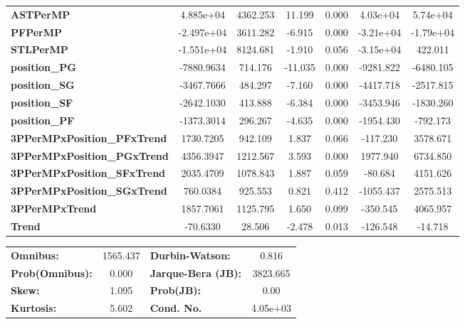 \begin{center}
\begin{tabular}{lcccccc}
\textbf{ASTPerMP}                   &    4.885e+04  &     4362.253     &    11.199  &         0.000        &     4.03e+04    &     5.74e+04     \\
\textbf{PFPerMP}                    &   -2.497e+04  &     3611.282     &    -6.915  &         0.000        &    -3.21e+04    &    -1.79e+04     \\
\textbf{STLPerMP}                   &   -1.551e+04  &     8124.681     &    -1.910  &         0.056        &    -3.15e+04    &      422.011     \\
\textbf{position\_PG}               &   -7880.9634  &      714.176     &   -11.035  &         0.000        &    -9281.822    &    -6480.105     \\
\textbf{position\_SG}               &   -3467.7666  &      484.297     &    -7.160  &         0.000        &    -4417.718    &    -2517.815     \\
\textbf{position\_SF}               &   -2642.1030  &      413.888     &    -6.384  &         0.000        &    -3453.946    &    -1830.260     \\
\textbf{position\_PF}               &   -1373.3014  &      296.267     &    -4.635  &         0.000        &    -1954.430    &     -792.173     \\
\textbf{3PPerMPxPosition\_PFxTrend} &    1730.7205  &      942.109     &     1.837  &         0.066        &     -117.230    &     3578.671     \\
\textbf{3PPerMPxPosition\_PGxTrend} &    4356.3947  &     1212.567     &     3.593  &         0.000        &     1977.940    &     6734.850     \\
\textbf{3PPerMPxPosition\_SFxTrend} &    2035.4709  &     1078.843     &     1.887  &         0.059        &      -80.684    &     4151.626     \\
\textbf{3PPerMPxPosition\_SGxTrend} &     760.0384  &      925.553     &     0.821  &         0.412        &    -1055.437    &     2575.513     \\
\textbf{3PPerMPxTrend}              &    1857.7061  &     1125.795     &     1.650  &         0.099        &     -350.545    &     4065.957     \\
\textbf{Trend}                      &     -70.6330  &       28.506     &    -2.478  &         0.013        &     -126.548    &      -14.718     \\
\bottomrule
\end{tabular}
\begin{tabular}{lclc}
\textbf{Omnibus:}       & 1565.437 & \textbf{  Durbin-Watson:     } &    0.816  \\
\textbf{Prob(Omnibus):} &   0.000  & \textbf{  Jarque-Bera (JB):  } & 3823.665  \\
\textbf{Skew:}          &   1.095  & \textbf{  Prob(JB):          } &     0.00  \\
\textbf{Kurtosis:}      &   5.602  & \textbf{  Cond. No.          } & 4.05e+03  \\
\bottomrule
\end{tabular}
\end{center}

